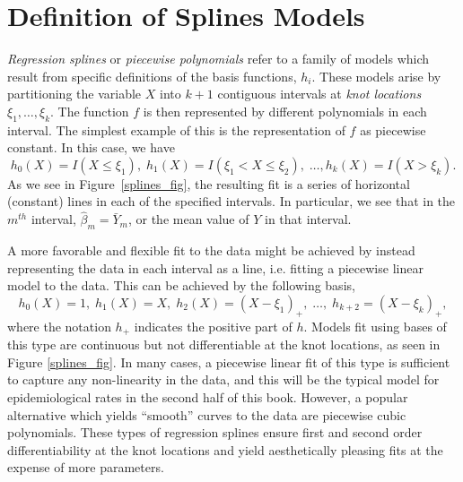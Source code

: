 \section{Definition of Splines Models}

\emph{Regression splines} or \emph{piecewise polynomials} refer to a
family of models which result from specific definitions of the basis
functions, $h_i$. These models arise by partitioning the variable $X$
into $k+1$ contiguous intervals at \emph{knot locations} $\xi_1,
\dots, \xi_{k}$. The function $f$ is then represented by different
polynomials in each interval. The simplest example of this is the
representation of $f$ as piecewise constant. In this case, we
have 
\[
h_0(X) = I(X \leq \xi_1),\; h_1(X)=I(\xi_1 < X \leq \xi_2), \;
\dots, h_{k}(X) = I(X > \xi_k). 
\]
As we see in Figure~\ref{splines_fig}, the resulting fit is a series
of horizontal (constant) lines in each of the specified intervals. In
particular, we see that in the $m^{th}$ interval, $\hat{\beta}_m =
\bar{Y}_m$, or the mean value of $Y$ in that interval.

A more favorable and flexible fit to the data might be achieved by
instead representing the data in each interval as a line, i.e. fitting
a piecewise linear model to the data. This can be achieved by the
following basis, 
\[
h_0(X) = 1,\; h_1(X) = X,\; h_2(X) = (X-\xi_1)_+,\; \dots,\; h_{k+2}=(X-\xi_k)_+,
\]
where the notation $h_+$ indicates the positive part of $h$. Models
fit using bases of this type are continuous but not differentiable at
the knot locations, as seen in Figure \ref{splines_fig}. In many
cases, a piecewise linear fit of this type is sufficient to capture
any non-linearity in the data, and this will be the typical model for
epidemiological rates in the second half of this book. However, a
popular alternative which yields ``smooth'' curves to the data are
piecewise cubic polynomials. These types of regression splines ensure
first and second order differentiability at the knot locations and
yield aesthetically pleasing fits at the expense of more parameters.


